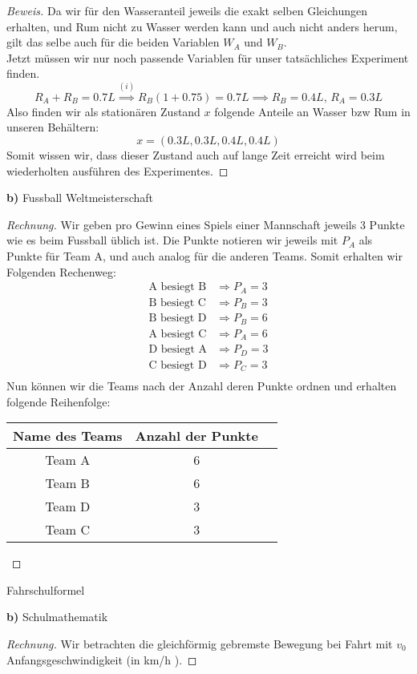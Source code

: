 \documentclass[a4paper]{article}
\newenvironment{Aufgabe}[2][Aufgabe]{\begin{trivlist}
\item[\hskip \labelsep {\bfseries #1}\hskip \labelsep {\bfseries #2.}]}{\end{trivlist}}
\begin{document}
\begin{theorem}
\begin{proof}[Beweis]
	Da wir für den Wasseranteil jeweils die exakt selben
	Gleichungen erhalten, und Rum nicht zu Wasser werden kann
	und auch nicht anders herum, gilt das selbe auch für 
	die beiden Variablen $W_A$ und $W_B$.
	\\

	Jetzt müssen wir nur noch passende Variablen für 
	unser tatsächliches Experiment finden.
	\[
	R_A + R_B = 0.7 L
	\overset{(i)} \implies R_B \left(
		1 + 0.75
	\right) = 0.7 L
	\implies 
	R_B = 0.4L, \,
	R_A = 0.3L
	\] 
	Also finden wir als stationären Zustand $x$ folgende Anteile
	an Wasser bzw Rum in unseren Behältern:
	\[
	x = \left(
		0.3 L, 0.3 L, 0.4 L, 0.4 L
	\right) 
	\] 
	Somit wissen wir, dass dieser Zustand auch auf lange Zeit
	erreicht wird beim wiederholten ausführen des Experimentes.
\end{proof}
\end{theorem}

\textbf{b)} Fussball Weltmeisterschaft

\begin{proof}[Rechnung]
	Wir geben pro Gewinn eines Spiels einer Mannschaft jeweils
	3 Punkte wie es beim Fussball üblich ist.
	Die Punkte notieren wir jeweils mit $P_A$ als Punkte für 
	Team A, und auch analog für die anderen Teams.
	Somit erhalten wir Folgenden Rechenweg:
	\begin{align*}
		\text{A besiegt B} & \Rightarrow P_A = 3 \\
		\text{B besiegt C} & \Rightarrow P_B = 3 \\
		\text{B besiegt D} & \Rightarrow P_B = 6 \\
		\text{A besiegt C} & \Rightarrow P_A = 6 \\
		\text{D besiegt A} & \Rightarrow P_D = 3 \\
		\text{C besiegt D} & \Rightarrow P_C = 3 \\
	\end{align*}
	Nun können wir die Teams nach der Anzahl deren Punkte ordnen
	und erhalten folgende Reihenfolge:
	\begin{center}
	\begin{tabular}{ |c|c|c| } 
	 \hline
	 Name des Teams & Anzahl der Punkte \\ 
	 \hline
	 Team A & 6 \\ 
	 Team B & 6 \\ 
	 Team D & 3 \\ 
	 Team C & 3 \\ 
	 \hline
	\end{tabular}
\end{center}
\end{proof}

\begin{theorem} %
\begin{Aufgabe}{30} %
	Fahrschulformel
\end{Aufgabe}

\textbf{b)} Schulmathematik

\begin{proof}[Rechnung]
	Wir betrachten die gleichförmig gebremste Bewegung bei
	Fahrt mit $v_0$ Anfangsgeschwindigkeit (in km/h ).
\end{proof}
\end{theorem}
\end{document}
